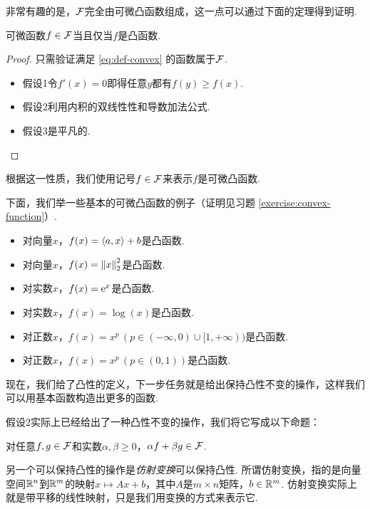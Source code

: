 非常有趣的是，$\mathcal F$完全由可微凸函数组成，这一点可以通过下面的定理得到证明. 

\begin{theorem}\label{thm:differential-convex-equivalence}
    可微函数$f\in\mathcal F$当且仅当$f$是凸函数.
\end{theorem}   
\begin{proof}
只需验证满足 \eqref{eq:def-convex} 的函数属于$\mathcal F$.
    \begin{itemize}
        \item 假设1令$f'(x)=0$即得任意$y$都有$f(y)\geq f(x)$.
        \item 假设2利用内积的双线性性和导数加法公式.
        \item 假设3是平凡的.
    \end{itemize}
\end{proof}

根据这一性质，我们使用记号$f\in\mathcal F$来表示$f$是可微凸函数.

下面，我们举一些基本的可微凸函数的例子（证明见习题 \ref{exercise:convex-function}）.

\begin{example}\label{ex:convex-function}
    \begin{itemize}
        \item 对向量$x$，$f(x)=\left\langle{a},{x}\right\rangle+b$是凸函数.
        \item 对向量$x$，$f(x)=\left\|x\right\|_2^2$是凸函数.
        \item 对实数$x$，$f(x)=\mathrm{e}^x$是凸函数.
        \item 对实数$x$，$f(x)=\log(x)$是凸函数.
        \item 对正数$x$，$f(x)=x^p\,(p\in(-\infty,0)\cup[1,+\infty))$是凸函数.
        \item 对正数$x$，$f(x)=x^p\,(p\in(0,1))$是凸函数.
    \end{itemize}
\end{example}

现在，我们给了凸性的定义，下一步任务就是给出保持凸性不变的操作，这样我们可以用基本函数构造出更多的函数. 

假设2实际上已经给出了一种凸性不变的操作，我们将它写成以下命题：
\begin{proposition}\label{prop:nonnegative-combination}
    对任意$f,g\in\mathcal F$和实数$\alpha,\beta\geq 0$，$\alpha f+\beta g\in\mathcal F$.
\end{proposition}

另一个可以保持凸性的操作是\textit{仿射变换}可以保持凸性. 所谓仿射变换，指的是向量空间$\mathbb{R}^n$到$\mathbb{R}^m$的映射$x\mapsto Ax+b$，其中$A$是$m\times n$矩阵，$b\in\mathbb{R}^m$. 仿射变换实际上就是带平移的线性映射，只是我们用变换的方式来表示它. 

